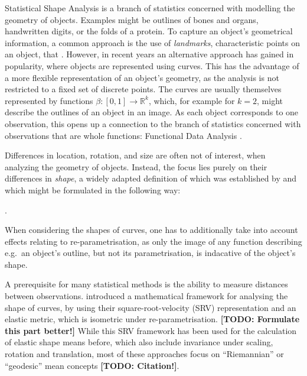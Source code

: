 Statistical Shape Analysis \parencite[see e.g.][]{DrydenMardia2016} is a branch of statistics concerned with modelling the geometry of objects.
Examples might be outlines of bones and organs, handwritten digits, or the folds of a protein.
To capture an object's geometrical information, a common approach is the use of \textit{landmarks}, characteristic points on an object, that .
However, in recent years an alternative approach has gained in popularity, where objects are represented using curves.
This has the advantage of a more flexible representation of an object's geometry, as the analysis is not restricted to a fixed set of discrete points.
The curves are usually themselves represented by functions $\beta : [0,1] \rightarrow \mathbb{R}^k$, which, for example for $k = 2$, might describe the outlines of an object in an image. 
As each object corresponds to one observation, this opens up a connection to the branch of statistics concerned with observations that are whole functions: Functional Data Analysis \parencite[see e.g.][]{RamsaySilverman2005}.

Differences in location, rotation, and size are often not of interest, when analyzing the geometry of objects.
Instead, the focus lies purely on their differences in  \textit{shape}, a widely adapted definition of which was established by \cite{Kendall1977} and which might be formulated in the following way:
\begin{definition}[Shape] 
  .
\end{definition}
\noindent When considering the shapes of curves, one has to additionally take into account effects relating to re-parametrisation, as only the image of any function describing e.g.\ an object's outline, but not its parametrisation, is indacative of the object's shape.

A prerequisite for many statistical methods is the ability to measure distances between observations.
\cite{SrivastavaEtAl2011} introduced a mathematical framework for analysing the shape of curves, by using their square-root-velocity (SRV) representation and an elastic metric, which is isometric under re-parametrisation.
\textbf{[TODO: Formulate this part better!]}
While this SRV framework has been used for the calculation of elastic shape means before, which also include invariance under scaling, rotation and translation, most of these approaches focus on \enquote{Riemannian} or \enquote{geodesic} mean concepts \textbf{[TODO: Citation!]}.

